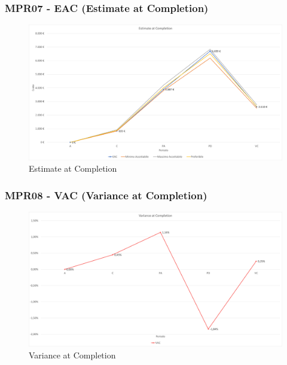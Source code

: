 \subsubsection{MPR07 - EAC (Estimate at Completion)}
\begin{figure}[!ht]
    \caption{Estimate at Completion}
    \vspace{10px}
    \includegraphics[scale=0.5]{sezioni/immagini/EstimateAtCompletion.png}
    \centering
\end{figure}
\pagebreak
\subsubsection{MPR08 - VAC (Variance at Completion)}
\begin{figure}[!ht]
    \caption{Variance at Completion}
    \vspace{10px}
    \includegraphics[scale=0.5]{sezioni/immagini/VarianceAtCompletion.png}
    \centering
\end{figure}
